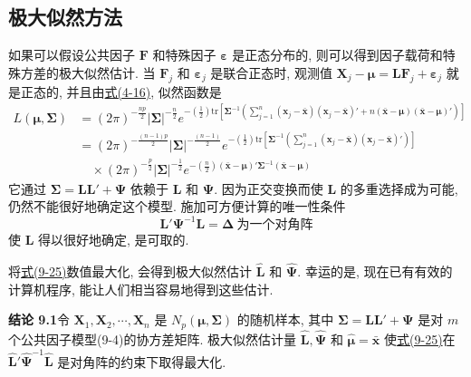 
\subsection{极大似然方法}

如果可以假设公共因子 $\mathbf{F}$ 和特殊因子 $\boldsymbol{\varepsilon}$ 是正态分布的, 则可以得到因子载荷和特殊方差的极大似然估计. 当 $\mathbf{F}_j$ 和 $\boldsymbol{\varepsilon}_j$ 是联合正态时, 观测值 $\mathbf{X}_j-\boldsymbol{\mu}=\mathbf{L}\mathbf{F}_j+\boldsymbol{\varepsilon}_j$ 就是正态的, 并且由\hyperref[eq:4-16]{式(4-16)}, 似然函数是
\label{eq:9-25}
\begin{equation}
\begin{aligned}
L(\boldsymbol{\mu},\boldsymbol{\Sigma})&=(2\pi)^{-\frac{np}{2}}|\boldsymbol{\Sigma}|^{-\frac{n}{2}}e^{-(\frac{1}{2})\mathrm{tr}\left[\boldsymbol{\Sigma}^{-1}\left(\sum\limits_{j=1}^{n}(\mathbf{x}_j-\bar{\mathbf{x}})(\mathbf{x}_j-\bar{\mathbf{x}})'+n(\bar{\mathbf{x}}-\boldsymbol{\mu})(\bar{\mathbf{x}}-\boldsymbol{\mu})'\right)\right]}\\
&=(2\pi)^{-\frac{(n-1)p}{2}}|\boldsymbol{\Sigma}|^{-\frac{(n-1)}{2}}e^{-(\frac{1}{2})\mathrm{tr}\left[\boldsymbol{\Sigma}^{-1}\left(\sum\limits_{j=1}^{n}(\mathbf{x}_j-\bar{\mathbf{x}})(\mathbf{x}_j-\bar{\mathbf{x}})'\right)\right]}\\
&\quad\times(2\pi)^{-\frac{p}{2}}|\boldsymbol{\Sigma}|^{-\frac{1}{2}}e^{-(\frac{n}{2})(\bar{\mathbf{x}}-\boldsymbol{\mu})'\boldsymbol{\Sigma}^{-1}(\bar{\mathbf{x}}-\boldsymbol{\mu})}
\end{aligned}
\tag{9-25}
\end{equation}
它通过 $\boldsymbol{\Sigma}=\mathbf{L}\mathbf{L}'+\boldsymbol{\Psi}$ 依赖于 $\mathbf{L}$ 和 $\boldsymbol{\Psi}$. 因为正交变换而使 $\mathbf{L}$ 的多重选择成为可能, 仍然不能很好地确定这个模型. 施加可方便计算的唯一性条件
\label{eq:9-26}
\begin{equation}
\mathbf{L}'\boldsymbol{\Psi}^{-1}\mathbf{L}=\boldsymbol{\Delta}\ \text{为一个对角阵}
\tag{9-26}
\end{equation}
使 $\mathbf{L}$ 得以很好地确定, 是可取的.

将\hyperref[eq:9-25]{式(9-25)}数值最大化, 会得到极大似然估计 $\hat{\mathbf{L}}$ 和 $\hat{\boldsymbol{\Psi}}$. 幸运的是, 现在已有有效的计算机程序, 能让人们相当容易地得到这些估计.

\noindent\textbf{结论 9.1}\quad 令 $\mathbf{X}_1,\mathbf{X}_2,\cdots,\mathbf{X}_n$ 是 $N_p(\boldsymbol{\mu},\boldsymbol{\Sigma})$ 的随机样本, 其中 $\boldsymbol{\Sigma}=\mathbf{L}\mathbf{L}'+\boldsymbol{\Psi}$ 是对 $m$ 个公共因子模型(9-4)的协方差矩阵. 极大似然估计量 $\hat{\mathbf{L}},\hat{\boldsymbol{\Psi}}$ 和 $\hat{\boldsymbol{\mu}}=\bar{\mathbf{x}}$ 使\hyperref[eq:9-25]{式(9-25)}在 $\hat{\mathbf{L}}'\hat{\boldsymbol{\Psi}}^{-1}\hat{\mathbf{L}}$ 是对角阵的约束下取得最大化.

